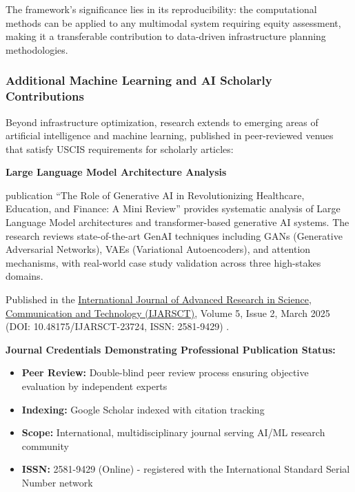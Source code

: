 The framework's significance lies in its reproducibility: the computational methods can be applied to any multimodal system requiring equity assessment, making it a transferable contribution to data-driven infrastructure planning methodologies.


\subsubsection{Additional Machine Learning and AI Scholarly Contributions}
\label{scholar:additional}

Beyond infrastructure optimization, \drs research extends to emerging areas of artificial intelligence and machine learning, published in peer-reviewed venues that satisfy USCIS requirements for scholarly articles:

\textbf{Large Language Model Architecture Analysis}

\drs publication ``The Role of Generative AI in Revolutionizing Healthcare, Education, and Finance: A Mini Review'' provides systematic analysis of Large Language Model architectures and transformer-based generative AI systems. The research reviews state-of-the-art GenAI techniques including GANs (Generative Adversarial Networks), VAEs (Variational Autoencoders), and attention mechanisms, with real-world case study validation across three high-stakes domains.

Published in the \underline{International Journal of Advanced Research in Science,}\\ \underline{Communication and Technology (IJARSCT)}, Volume 5, Issue 2, March 2025 (DOI: 10.48175/IJARSCT-23724, ISSN: 2581-9429) \cite{SR2}.

\textbf{Journal Credentials Demonstrating Professional Publication Status:}
\begin{itemize}
    \item \textbf{Peer Review:} Double-blind peer review process ensuring objective evaluation by independent experts
    \item \textbf{Indexing:} Google Scholar indexed with citation tracking
    \item \textbf{Scope:} International, multidisciplinary journal serving AI/ML research community
    \item \textbf{ISSN:} 2581-9429 (Online) - registered with the International Standard Serial Number network
\end{itemize}

